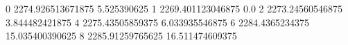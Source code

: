 0 2274.926513671875 5.525390625
1 2269.401123046875 0.0
2 2273.24560546875 3.844482421875
4 2275.43505859375 6.033935546875
6 2284.4365234375 15.035400390625
8 2285.91259765625 16.511474609375
